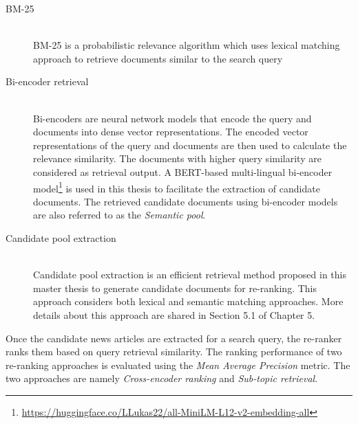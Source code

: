 \begin{description}
	\item[BM-25]  \hfill \\ BM-25 is a probabilistic relevance algorithm which uses lexical matching approach to retrieve documents similar to the search query~\cite{amati_bm25_2009}
	
	\item[Bi-encoder retrieval]  \hfill \\ Bi-encoders are neural network models that encode the query and documents into dense vector representations. The encoded vector representations of the query and documents are then used to calculate the relevance similarity. The documents with higher query similarity are considered as retrieval output. A BERT-based multi-lingual bi-encoder model\footnote{\url{https://huggingface.co/LLukas22/all-MiniLM-L12-v2-embedding-all}} is used in this thesis to facilitate the extraction of candidate documents. The retrieved candidate documents using bi-encoder models are also referred to as the \textit{Semantic pool}.
	
	
	\item[Candidate pool extraction]  \hfill \\ Candidate pool extraction is an efficient retrieval method proposed in this master thesis to generate candidate documents for re-ranking. This approach considers both lexical and semantic matching approaches. More details about this approach are shared in Section 5.1 of Chapter 5.
	
\end{description}

Once the candidate news articles are extracted for a search query, the re-ranker ranks them based on query retrieval similarity. The ranking performance of two re-ranking approaches is evaluated using the \textit{Mean Average Precision} metric. The two approaches are namely \textit{Cross-encoder ranking} and \textit{Sub-topic retrieval}.




